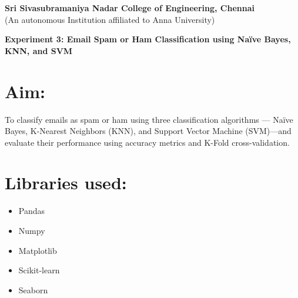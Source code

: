\documentclass[11pt]{article}
\begin{document}
\begin{center}
    \large \textbf{Sri Sivasubramaniya Nadar College of Engineering, Chennai} \\
    (An autonomous Institution affiliated to Anna University) \\
    \vspace{0.3cm}
\end{center}

\begin{table}[!h]
\renewcommand{\arraystretch}{1.5}
\end{table}

\vspace{0.5cm}

\begin{center}
 \textbf{Experiment 3: Email Spam or Ham Classification using Naïve Bayes, KNN, and SVM}
\end{center}

\noindent
\section{Aim:} 
 To classify emails as spam or ham using three classification algorithms — Naïve Bayes, K-Nearest Neighbors (KNN), and Support Vector Machine (SVM)—and evaluate their performance using accuracy metrics and K-Fold cross-validation.

\vspace{0.4cm}
\noindent
\section{Libraries used:}
\begin{itemize}
    \item {Pandas}
    \item {Numpy}
    \item {Matplotlib}
    \item {Scikit-learn}
    \item {Seaborn}
\end{itemize}
\end{document}
